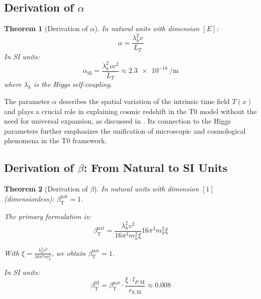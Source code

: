 \documentclass[12pt,a4paper]{article}
\newcommand{\Tfield}{T(x)}
\newcommand{\betaT}{\beta_{\text{T}}}
\newtheorem{theorem}{Theorem}[section]
\begin{document}
	\subsection{Derivation of \(\alpha\)}
	\label{subsec:alpha_derivation}
	
	\begin{theorem}[Derivation of \(\alpha\)]
		In natural units with dimension \([E]\):
		\begin{equation}
			\alpha = \frac{\lambda_h^2 v}{L_T}
		\end{equation}
		In SI units:
		\begin{equation}
			\alpha_{\text{SI}} = \frac{\lambda_h^2 v c^2}{L_T} \approx \SI{2.3e-18}{\per\meter}
		\end{equation}
		where \(\lambda_h\) is the Higgs self-coupling.
	\end{theorem}
	
	The parameter \(\alpha\) describes the spatial variation of the intrinsic time field \(\Tfield\) and plays a crucial role in explaining cosmic redshift in the T0 model without the need for universal expansion, as discussed in \cite{pascher_messdifferenzen_2025}. Its connection to the Higgs parameters further emphasizes the unification of microscopic and cosmological phenomena in the T0 framework.
	
	\subsection{Derivation of \(\beta\): From Natural to SI Units}
	\label{subsec:beta_derivation}
	
	\begin{theorem}[Derivation of \(\beta\)]
		In natural units with dimension \([1]\) (dimensionless): \(\betaT^{\text{nat}} = 1\).
		
		The primary formulation is:
		\begin{equation}
			\betaT^{\text{nat}} = \frac{\lambda_h^2 v^2}{16\pi^3 m_h^2 \xi}{16\pi^3 m_h^2 \xi}
		\end{equation}
		
		With \(\xi = \frac{\lambda_h^2 v^2}{16\pi^3 m_h^2}\), we obtain \(\betaT^{\text{nat}} = 1\).
		
		In SI units:
		\begin{equation}
			\betaT^{\text{SI}} = \betaT^{\text{nat}} \cdot \frac{\xi \cdot l_{P,\text{SI}}}{r_{0,\text{SI}}} \approx 0.008
		\end{equation}
	\end{theorem}
	
\end{document}
